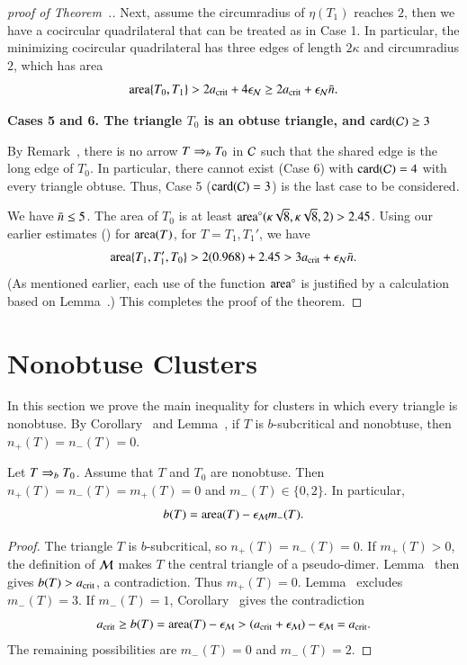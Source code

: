 \begin{proof}[proof of Theorem~.]
Next, assume the circumradius of $\eta(T_1)$ reaches $2$, then we
have a cocircular quadrilateral that can be treated as in Case 1.  In
particular, the minimizing cocircular quadrilateral has three edges of
length $2\kappa$ and circumradius $2$, which has area
\[
{\operatorname{area}}\{T_0,T_1\}
>  2a_\text{crit}+4\epsilon_{\mathcal N} \ge 2a_\text{crit}+\epsilon_{\mathcal N}\bar n.
\]

{\bf Cases 5 and 6. The triangle $T_0$ is an obtuse triangle, and
  ${\operatorname{card}}(\mathcal C)\ge3$} %

By Remark~, there is no arrow $T \Rightarrow_{b} T_0$ in $\mathcal C$
such that the shared edge is the long edge of $T_0$.  In particular,
there cannot exist (Case 6) with ${\operatorname{card}}(\mathcal C)=4$ with %
every triangle obtuse.  Thus, Case 5 (${\operatorname{card}}(\mathcal C)=3$) is the last case to be
considered.

We have $\bar n\le 5$.
The area of $T_0$ is at least
${\operatorname{area}}^\circ(\kappa\sqrt{8},\kappa\sqrt{8},2) > 2.45$.  
Using our earlier estimates ()
for ${\operatorname{area}}(T)$, for $T=T_1,T_1'$, we
have
\[
{\operatorname{area}}\{T_1,T_1',T_0\} > 2 (0.968) + 2.45 > 3a_\text{crit} + \epsilon_{\mathcal N}\bar n.
\] 
(As mentioned earlier, each use of the function ${\operatorname{area}}^\circ$ is justified
by a calculation based on Lemma~.)
This completes the proof of the theorem.
\end{proof}

\section{Nonobtuse Clusters}

In this section we prove the main inequality for clusters in which
every triangle is nonobtuse.  By Corollary~ and
Lemma~, if $T$ is $b$-subcritical and nonobtuse, then
$n_+(T)=n_-(T)=0$.

\begin{lemma}
  Let $T\Rightarrow_{b} T_0$. Assume that $T$ and $T_0$ are nonobtuse. Then
  $n_+(T)=n_-(T)=m_+(T)=0$ and $m_-(T)\in\{0,2\}$. In particular,
  \[
  b(T)={\operatorname{area}}(T)-\epsilon_{\mathcal M} m_-(T).
  \]
\end{lemma}

\begin{proof}
  The triangle $T$ is $b$-subcritical, so $n_+(T)=n_-(T)=0$.
  If $m_+(T)>0$, the definition of $\mathcal M$ makes $T$ the central
  triangle of a pseudo-dimer. Lemma~ then gives
  $b(T)>a_\text{crit}$, a contradiction. Thus $m_+(T)=0$.
  Lemma~ excludes $m_-(T)=3$. If $m_-(T)=1$,
  Corollary~ gives the contradiction
  \[
  a_\text{crit}\ge b(T)={\operatorname{area}}(T)-\epsilon_{\mathcal M}
  >(a_\text{crit}+\epsilon_{\mathcal M})-\epsilon_{\mathcal M}=a_\text{crit}.
  \]
  The remaining possibilities are $m_-(T)=0$ and $m_-(T)=2$.
\end{proof}

